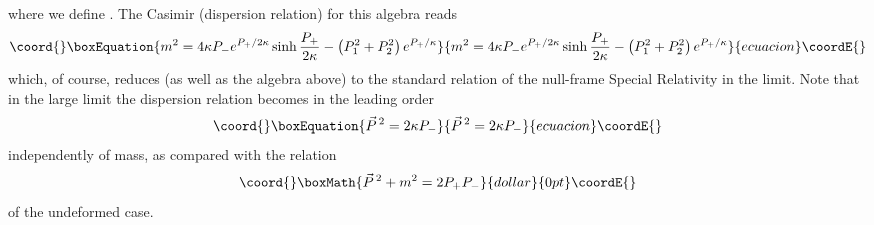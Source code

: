 \documentclass [12pt]  {article}
\def\vP{\vec{P}\, {}^2}
\begin{document}
where we define \myHighlight{$\vP = P_1^2 + P_2^2$}\coordHE{}. The Casimir  (dispersion
relation) for this algebra reads
\begin{equation}\coord{}\boxEquation{\label{6}
 m^2=4\kappa
P_{-}e^{P_{+}/2\kappa}\sinh{\frac{P_{+}}{2\kappa}}-\left(P_1^2+P_2^2\right)e^{P_{+}/\kappa}
}{m^2=4\kappa
P_{-}e^{P_{+}/2\kappa}\sinh{\frac{P_{+}}{2\kappa}}-\left(P_1^2+P_2^2\right)e^{P_{+}/\kappa}
}{ecuacion}\coordE{}\end{equation}
which, of course, reduces (as well as the algebra above) to the
standard relation of the null-frame Special Relativity in the
\myHighlight{$\kappa\rightarrow\infty$}\coordHE{} limit. Note that in the large \coordHE{}
limit the dispersion relation becomes in the leading order
\begin{equation}\coord{}\boxEquation{\label{a}
\vP = 2\kappa P_-
}{\vP = 2\kappa P_-
}{ecuacion}\coordE{}\end{equation}
independently of mass, as compared with the relation
$$\coord{}\boxMath{
\vP + m^2 = 2P_+ P_-
}{dollar}{0pt}\coordE{}$$
of the undeformed case.
\end{document}
